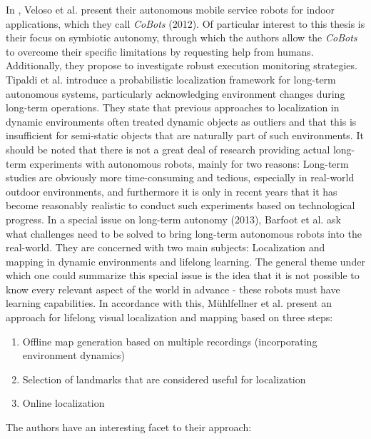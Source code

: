 \documentclass[english, master, utf8]{base/thesis_KBS}
\begin{document}
In \cite{Veloso:2012}, Veloso et al. present their autonomous mobile service robots for indoor applications, which they call \textit{CoBots} (2012). Of particular interest to this thesis
is their focus on symbiotic autonomy, through which the authors allow the \textit{CoBots} to overcome their specific limitations by requesting help from humans.
Additionally, they propose to investigate robust execution monitoring strategies.\newline
Tipaldi et al. \cite{Tipaldi:2013} introduce a probabilistic localization framework for long-term autonomous systems, particularly acknowledging environment changes during
long-term operations. They state that previous approaches to localization in dynamic environments often treated dynamic objects as outliers and that this is insufficient
for semi-static objects that are naturally part of such environments.\newline
It should be noted that there is not a great deal of research providing actual long-term experiments with autonomous robots, mainly for two reasons:
Long-term studies are obviously more time-consuming and tedious, especially in real-world outdoor environments, and furthermore it is only in recent years that it has become
reasonably realistic to conduct such experiments based on technological progress. \cite{Leite:2013}\newline
In a special issue on long-term autonomy (2013), Barfoot et al. \cite{Barfoot:2013} ask what challenges need to be solved to bring long-term autonomous robots into the real-world. They are concerned with
two main subjects: Localization and mapping in dynamic environments and lifelong learning. The general theme under which one could summarize this special issue is the idea that it is
not possible to know every relevant aspect of the world in advance - these robots must have learning capabilities.
In accordance with this, Mühlfellner et al. \cite{Muehlfellner:2015} present an approach for lifelong visual localization and mapping based on three steps:
\begin{enumerate}
    \item Offline map generation based on multiple recordings (incorporating environment dynamics)
    \item Selection of landmarks that are considered useful for localization
    \item Online localization
\end{enumerate}
The authors have an interesting facet to their approach:  \cite{Muehlfellner:2015}\newline
\end{document}
